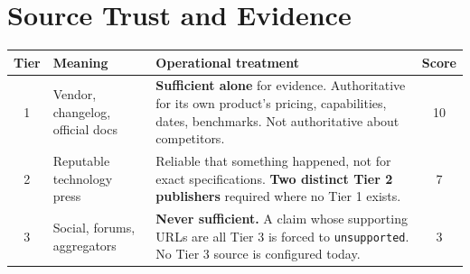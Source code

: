 \documentclass[10pt,a4paper]{article}
\newcommand{\cd}[1]{\texttt{\footnotesize\hyphenpenalty=0\exhyphenpenalty=0\relax #1}}
\begin{document}
\section{Source Trust and Evidence}

\begin{center}\footnotesize
\begin{tabularx}{\textwidth}{@{}c >{\RaggedRight}p{3.9cm} >{\RaggedRight}X c@{}}
\toprule
\textbf{Tier} & \textbf{Meaning} & \textbf{Operational treatment} & \textbf{Score} \\
\midrule
1 & Vendor, changelog, official docs & \textbf{Sufficient alone} for evidence. Authoritative for its own product's pricing, capabilities, dates, benchmarks. Not authoritative about competitors. & 10 \\
2 & Reputable technology press & Reliable that something happened, not for exact specifications. \textbf{Two distinct Tier 2 publishers} required where no Tier 1 exists. & 7 \\
3 & Social, forums, aggregators & \textbf{Never sufficient.} A claim whose supporting URLs are all Tier 3 is forced to \cd{unsupported}. No Tier 3 source is configured today. & 3 \\
\bottomrule
\end{tabularx}
\end{center}
\end{document}
